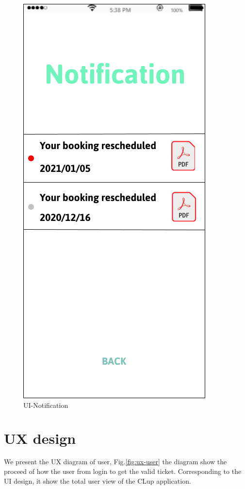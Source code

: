 \documentclass[a4paper,12pt]{report}
\begin{document}
\begin{figure}[H]
	\centering
	\includegraphics[scale=0.6]{UI-Notification}
	\caption{UI-Notification}
	\centering
	\label{fig:ui-notification}
\end{figure}

\section{UX design}
We present the UX diagram of user, Fig.\ref{fig:ux-user} the diagram show the proceed of how the user from login to get the valid ticket. Corresponding to the UI design, it show the total user view of the CLup application.~\\
\end{document}
